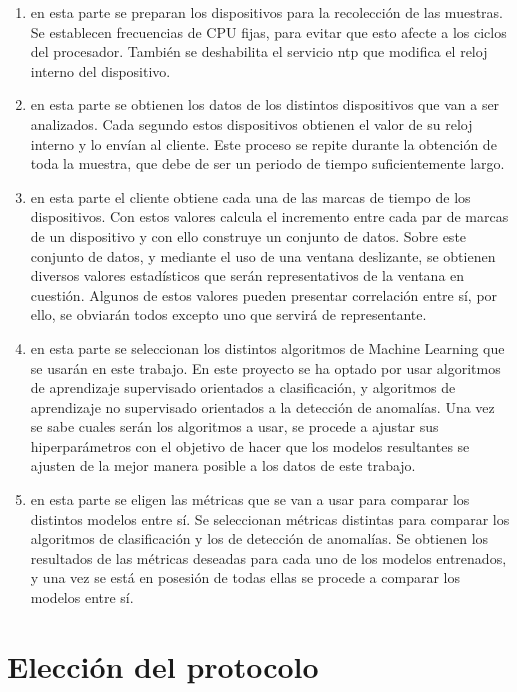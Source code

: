 \begin{enumerate}[label=\textbf{\Alph*}:]
    \item en esta parte se preparan los dispositivos para la recolección de las muestras. Se establecen frecuencias de CPU fijas, para evitar que esto afecte a los ciclos del procesador. También se deshabilita el servicio \acrshort{ntp} que modifica el reloj interno del dispositivo.
    \item en esta parte se obtienen los datos de los distintos dispositivos que van a ser analizados. Cada segundo estos dispositivos obtienen el valor de su reloj interno y lo envían al cliente. Este proceso se repite durante la obtención de toda la muestra, que debe de ser un periodo de tiempo suficientemente largo.
    \item en esta parte el cliente obtiene cada una de las marcas de tiempo de los dispositivos. Con estos valores calcula el incremento entre cada par de marcas de un dispositivo y con ello construye un conjunto de datos. Sobre este conjunto de datos, y mediante el uso de una ventana deslizante, se obtienen diversos valores estadísticos que serán representativos de la ventana en cuestión. Algunos de estos valores pueden presentar correlación entre sí, por ello, se obviarán todos excepto uno que servirá de representante.
    \item en esta parte se seleccionan los distintos algoritmos de Machine Learning que se usarán en este trabajo. En este proyecto se ha optado por usar algoritmos de aprendizaje supervisado orientados a clasificación, y algoritmos de aprendizaje no supervisado orientados a la detección de anomalías. Una vez se sabe cuales serán los algoritmos a usar, se procede a ajustar sus hiperparámetros con el objetivo de hacer que los modelos resultantes se ajusten de la mejor manera posible a los datos de este trabajo.
    \item en esta parte se eligen las métricas que se van a usar para comparar los distintos modelos entre sí. Se seleccionan métricas distintas para comparar los algoritmos de clasificación y los de detección de anomalías. Se obtienen los resultados de las métricas deseadas para cada uno de los modelos entrenados, y una vez se está en posesión de todas ellas se procede a comparar los modelos entre sí.
\end{enumerate}

\section{Elección del protocolo}

